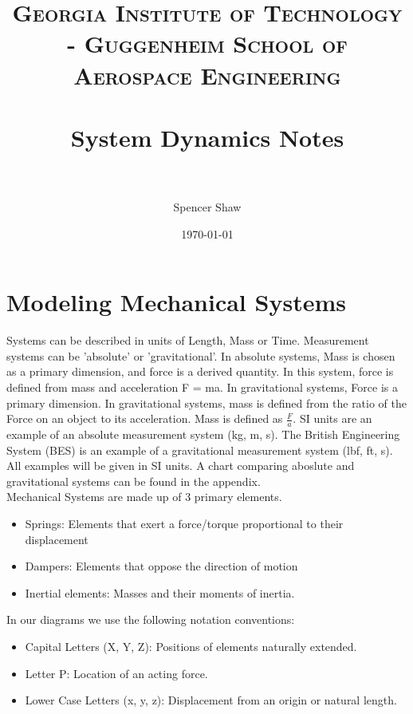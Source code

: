 \documentclass[paper=a4, fontsize=11pt]{scrartcl} %
\title{	
\normalfont \normalsize 
\textsc{Georgia Institute of Technology - Guggenheim School of Aerospace Engineering} \\ [25pt] %
\horrule{0.5pt} \\[0.4cm] %
\huge System Dynamics Notes \\ %
\horrule{2pt} \\[0.5cm] %
}
\author{Spencer Shaw} %
\date{\normalsize\today} %
\numberwithin{equation}{section} %
\numberwithin{figure}{section} %
\numberwithin{table}{section} %
\begin{document}
\maketitle %


\section{Modeling Mechanical Systems}

Systems can be described in units of Length, Mass or Time. Measurement systems can be 'absolute' or 'gravitational'. In absolute systems, Mass is chosen as a primary dimension, and force is a derived quantity. In this system, force is defined from mass and acceleration F = ma. In gravitational systems, Force is a primary dimension. In gravitational systems, mass is defined from the ratio of the Force on an object to its acceleration. Mass is defined as $\frac{F}{a}$. SI units are an example of an absolute measurement system (kg, m, s). The British Engineering System (BES) is an example of a gravitational measurement system (lbf, ft, s). All examples will be given in SI units. A chart comparing aboslute and gravitational systems can be found in the appendix.\\

Mechanical Systems are made up of 3 primary elements. 
\begin{itemize}
\setlength\itemsep{0em}
\item Springs: Elements that exert a force/torque proportional to their displacement
\item Dampers: Elements that oppose the direction of motion 
\item Inertial elements: Masses and their moments of inertia. \\
\end{itemize} 

In our diagrams we use the following notation conventions: 
\begin{itemize}
\setlength\itemsep{0em}
\item Capital Letters (X, Y, Z): Positions of elements naturally extended.
\item Letter P: Location of an acting force.
\item Lower Case Letters (x, y, z): Displacement from an origin or natural length.\\
\end{itemize}
\end{document}
